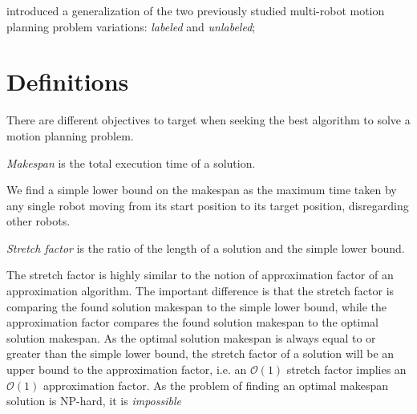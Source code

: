 \cite{ijrr/SoloveyH14} introduced a generalization of the two previously studied multi-robot motion planning problem variations: \emph{labeled} and \emph{unlabeled}; 





\section{Definitions}

There are different objectives to target when seeking the best algorithm to solve a motion planning problem. 

\begin{definition}
    \emph{Makespan} is the total execution time of a solution. 
\end{definition}

We find a simple lower bound on the makespan as the maximum time taken by any single robot moving from its start position to its target position, disregarding other robots.  

\begin{definition}
    \emph{Stretch factor} is the ratio of the length of a solution and the simple lower bound.
\end{definition}

\begin{remark}
    The stretch factor is highly similar to the notion of approximation factor of an approximation algorithm. 
    The important difference is that the stretch factor is comparing the found solution makespan to the simple lower bound, while the approximation factor compares the found solution makespan to the optimal solution makespan. 
    As the optimal solution makespan is always equal to or greater than the simple lower bound, the stretch factor of a solution will be an upper bound to the approximation factor, i.e. an $\mathcal{O}(1)$ stretch factor implies an $\mathcal{O}(1)$ approximation factor.
    As the problem of finding an optimal makespan solution is NP-hard, it is \emph{impossible} \TODO
\end{remark}
